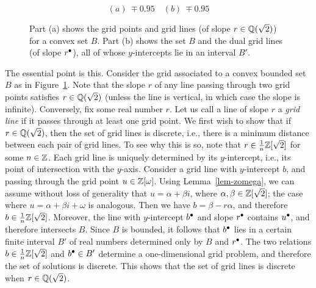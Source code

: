 \documentclass{article}
\begin{document}
\begin{figure}
  \[ (a)~
  \mp{0.95}{}
  \quad (b)~
  \mp{0.95}{}
  \]
  \caption{Part (a) shows the grid points and grid lines (of slope
    $r\in{\mathbb{Q}}(\sqrt 2)$) for a convex set $B$. Part (b) shows the set
    $B$ and the dual grid lines (of slope $r^{\bullet}$), all of whose
    $y$-intercepts lie in an interval $B'$.  }
  \label{fig-x}
\end{figure}

The essential point is this. Consider the grid associated to a convex
bounded set $B$ as in Figure~\ref{fig-x}. Note that the slope $r$ of
any line passing through two grid points satisfies $r\in{\mathbb{Q}}(\sqrt 2)$
(unless the line is vertical, in which case the slope is infinite).
Conversely, fix some real number $r$.  Let us call a line of slope $r$
a {\em grid line} if it passes through at least one grid point. We
first wish to show that if $r\in{\mathbb{Q}}(\sqrt2)$, then the set of grid
lines is discrete, i.e., there is a minimum distance between each pair
of grid lines. To see why this is so, note that
$r\in\frac{1}{n}\mathbb{Z}[\sqrt2]$ for some $n\in\mathbb{Z}$. Each grid line is
uniquely determined by its $y$-intercept, i.e., its point of
intersection with the $y$-axis.  Consider a grid line with
$y$-intercept $b$, and passing through the grid point
$u\in\mathbb{Z}[\omega]$. Using Lemma~\ref{lem-zomega}, we can assume without
loss of generality that $u=\alpha+\beta i$, where
$\alpha,\beta\in\mathbb{Z}[\sqrt2]$; the case where $u=\alpha+\beta i+\omega$
is analogous. Then we have $b=\beta-r\alpha$, and therefore
$b\in\frac{1}{n}\mathbb{Z}[\sqrt2]$. Moreover, the line with $y$-intercept
$b^{\bullet}$ and slope $r^{\bullet}$ contains $u^{\bullet}$, and therefore intersects
$B$. Since $B$ is bounded, it follows that $b^{\bullet}$ lies in a certain
finite interval $B'$ of real numbers determined only by $B$ and
$r^{\bullet}$.  The two relations $b\in\frac{1}{n}\mathbb{Z}[\sqrt2]$ and
$b^{\bullet}\in B'$ determine a one-dimensional grid problem, and therefore
the set of solutions is discrete. This shows that the set of grid
lines is discrete when $r\in{\mathbb{Q}}(\sqrt2)$.
\end{document}
